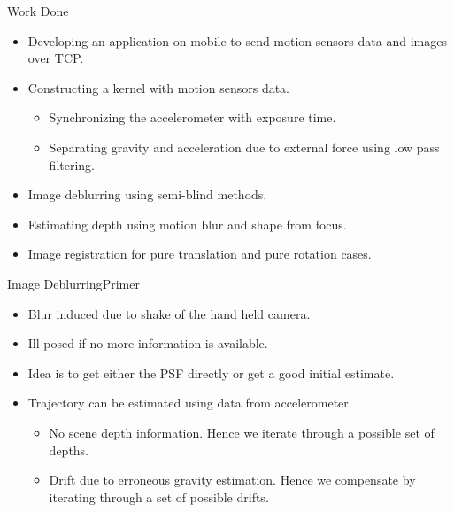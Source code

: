 \documentclass{beamer}
\begin{document}
\begin{frame}{Work Done}
\begin{itemize}
	\item Developing an application on mobile to send motion sensors 
	data and images over TCP. 
	\item Constructing a kernel with motion sensors data.
	\begin{itemize}
		\item Synchronizing the accelerometer with exposure time.
		\item Separating gravity and acceleration due to external force using
		low pass filtering.
	\end{itemize}
	\item Image deblurring using semi-blind methods.
	\item Estimating depth using motion blur and shape from focus.
	\item Image registration for pure translation and pure rotation cases.
\end{itemize}
\end{frame}

\begin{frame}{Image Deblurring}{Primer}
\begin{itemize}
	\item Blur induced due to shake of the hand held camera. 
	\item Ill-posed if no more information is available.
	\item Idea is to get either the PSF directly or get a good initial
	estimate.
	\item Trajectory can be estimated using data from accelerometer. 
	\begin{itemize}
	\item No scene depth information. Hence we iterate through a possible set of 
	depths. 
	\item Drift due to erroneous gravity estimation. Hence we compensate by
	iterating through a set of possible drifts.
	\end{itemize}
\end{itemize}
\end{frame}
\end{document}
